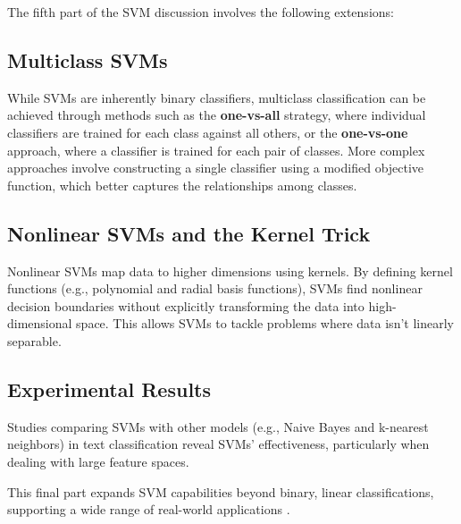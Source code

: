 \documentclass{article}
\begin{document}
The fifth part of the SVM discussion involves the following extensions:

\subsection{Multiclass SVMs}
While SVMs are inherently binary classifiers, multiclass classification can be achieved through methods such as the \textbf{one-vs-all} strategy, where individual classifiers are trained for each class against all others, or the \textbf{one-vs-one} approach, where a classifier is trained for each pair of classes. More complex approaches involve constructing a single classifier using a modified objective function, which better captures the relationships among classes.

\subsection{Nonlinear SVMs and the Kernel Trick}
Nonlinear SVMs map data to higher dimensions using kernels. By defining kernel functions (e.g., polynomial and radial basis functions), SVMs find nonlinear decision boundaries without explicitly transforming the data into high-dimensional space. This allows SVMs to tackle problems where data isn't linearly separable.

\subsection{Experimental Results}
Studies comparing SVMs with other models (e.g., Naive Bayes and k-nearest neighbors) in text classification reveal SVMs' effectiveness, particularly when dealing with large feature spaces.

This final part expands SVM capabilities beyond binary, linear classifications, supporting a wide range of real-world applications \cite{source}.
\end{document}
